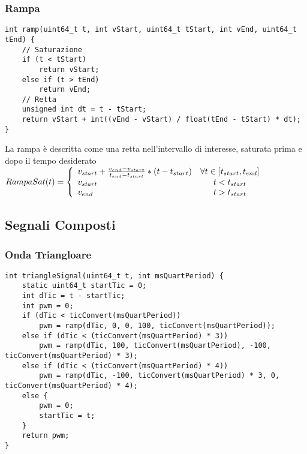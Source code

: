 \subsubsection{Rampa}
\begin{lstlisting}[style=cppStyle,caption={Rampa Saturata},label=lst:rampa] 
int ramp(uint64_t t, int vStart, uint64_t tStart, int vEnd, uint64_t tEnd) {
	// Saturazione
	if (t < tStart)
		return vStart;
	else if (t > tEnd)
		return vEnd;
	// Retta
	unsigned int dt = t - tStart;
	return vStart + int((vEnd - vStart) / float(tEnd - tStart) * dt);
}
\end{lstlisting}
La rampa è descritta come una retta nell'intervallo di interesse, saturata prima e dopo il tempo desiderato\\
$ RampaSat(t) =
	\left \{ \begin{array}{l c}
		v_{start} + \frac{v_{end}-v_{start}}{t_{end}-t_{start}} * (t - t_{start}) & \forall t \in [t_{start},t_{end}] \\
		v_{start}                                                                 & t<t_{start}                       \\
		v_{end}                                                                   & t>t_{start}
	\end{array}
	\right.
$

\newpage
\subsection{Segnali Composti}

\subsubsection{Onda Triangloare}
\begin{lstlisting}[style=cppStyle,caption={Onda Triangolare Periodica},label=lst:ondaTriangloare] 
int triangleSignal(uint64_t t, int msQuartPeriod) {
	static uint64_t startTic = 0;
	int dTic = t - startTic;
	int pwm = 0;
	if (dTic < ticConvert(msQuartPeriod))
		pwm = ramp(dTic, 0, 0, 100, ticConvert(msQuartPeriod));
	else if (dTic < (ticConvert(msQuartPeriod) * 3))
		pwm = ramp(dTic, 100, ticConvert(msQuartPeriod), -100, ticConvert(msQuartPeriod) * 3);
	else if (dTic < (ticConvert(msQuartPeriod) * 4))
		pwm = ramp(dTic, -100, ticConvert(msQuartPeriod) * 3, 0, ticConvert(msQuartPeriod) * 4);
	else {
		pwm = 0;
		startTic = t;
	}
	return pwm;
}
\end{lstlisting}

